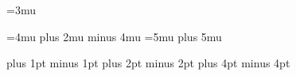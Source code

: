 \thinmuskip=3mu

\medmuskip=4mu plus 2mu minus 4mu
\thickmuskip=5mu plus 5mu

\smallskipamount=3pt plus 1pt minus 1pt
\medskipamount=6pt plus 2pt minus 2pt
\bigskipamount=12pt plus 4pt minus 4pt
\normalbaselineskip=12pt
\normallineskip=1pt
\normallineskiplimit=0pt
\jot=3pt

\maxdimen
\centering
\p@
\z@
\z@skip
\voidb@x
\magstephalf
\@ne
\tw@
\thr@@
\sixt@@n
\@cclv
\@cclvi
\@m
\@M
\@MM
\m@ne


